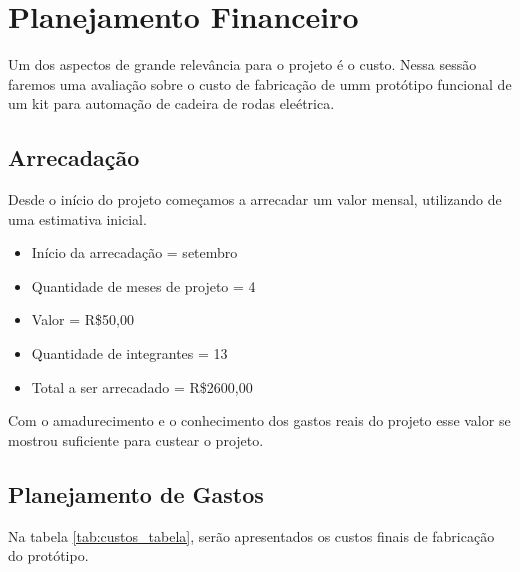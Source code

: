 \chapter[Planejamento Financeiro]{Planejamento Financeiro}

Um dos aspectos de grande relevância para o projeto é o custo. Nessa sessão faremos uma avaliação sobre o custo de fabricação de umm protótipo funcional de um kit para automação de cadeira de rodas eleétrica.

\section {Arrecadação}
Desde o início do projeto começamos a arrecadar um valor mensal, utilizando de uma estimativa inicial.

  \begin{itemize}
    \item Início da arrecadação = setembro
    \item Quantidade de meses de projeto = 4
    \item Valor = R\$50,00
    \item Quantidade de integrantes = 13
    \item Total a ser arrecadado = R\$2600,00
  \end{itemize}

Com o amadurecimento e o conhecimento dos gastos reais do projeto esse valor se mostrou suficiente para custear o projeto.

\section {Planejamento de Gastos}
Na tabela \ref{tab:custos_tabela}, serão apresentados os custos finais de fabricação do protótipo.

